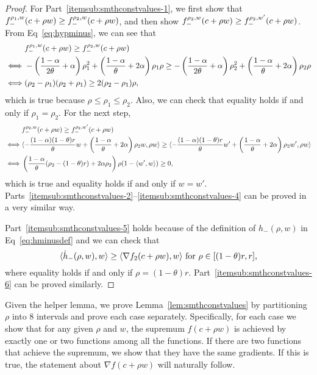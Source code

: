\begin{proof}
	For Part~\ref{itemsub:smthconstvalues-1}, we first show that 
	$f_-^{{\rho_1},{w}}(c+\rho w) \geq f_-^{{\rho_2},{w}}(c+\rho w)$, 
	and then show $f_-^{{\rho_2},{w}}(c+\rho w) \geq f_-^{{\rho_2},{w'}}(c+\rho w)$.
	From Eq~\eqref{eq:hypminus}, we can see that
	\begin{align*}
		&f_-^{{\rho_1},{w}}(c+\rho w) \geq f_-^{{\rho_2},{w}}(c+\rho w)\\
		\iff&- \left ( \frac{1-\alpha}{2\theta} + \alpha \right ) \rho_1^2
		+\left ( \frac{1-\alpha}{\theta}+2\alpha \right ) \rho_1 \rho 
		\geq 
		- \left ( \frac{1-\alpha}{2\theta} + \alpha \right ) \rho_2^2
		+\left ( \frac{1-\alpha}{\theta}+2\alpha \right ) \rho_2 \rho\\
		\iff& (\rho_2-\rho_1)(\rho_2+\rho_1) \geq 2(\rho_2-\rho_1)\rho,
	\end{align*}
	which is true because $\rho \leq \rho_1 \leq \rho_2$. Also, we can check that
	equality holds if and only if $\rho_1 = \rho_2$.
	For the next step,
	\begin{align*}
		&f_-^{{\rho_2},{w}}(c+\rho w) \geq f_-^{{\rho_2},{w'}}(c+\rho w)\\
		\iff&\langle -\frac{(1-\alpha)(1-\theta)r}{\theta} w
		+\left ( \frac{1-\alpha}{\theta}+2\alpha \right ) \rho_2 w, \rho w
		\rangle
		\geq
		\langle -\frac{(1-\alpha)(1-\theta)r}{\theta} w'
		+\left ( \frac{1-\alpha}{\theta}+2\alpha \right ) \rho_2 w', \rho w
		\rangle\\
		\iff& \left ( \frac{1-\alpha}{\theta} (\rho_2 - (1-\theta)r) + 2\alpha \rho_2 \right )
		\rho (1-\langle w',w\rangle) \geq 0,
	\end{align*}
	which is true and equality holds if and only if $w = w'$.
	Parts~\ref{itemsub:smthconstvalues-2}--\ref{itemsub:smthconstvalues-4} can be proved in a very similar way.
	
	Part~\ref{itemsub:smthconstvalues-5} holds because of the definition of $h_-(\rho,w)$ in Eq~\eqref{eq:hminusdef} and we can check that
	\begin{equation*}
		\langle \dot h_-(\rho,w), w \rangle \geq \langle \nabla f_{2}(c+\rho w), w \rangle \text{ for } \rho \in [(1-\theta)r,r],
	\end{equation*}
	where equality holds if and only if $\rho = (1-\theta)r$.  Part~\ref{itemsub:smthconstvalues-6} can be proved similarly.
\end{proof}

Given the helper lemma, we prove Lemma~\ref{lem:smthconstvalues} by partitioning $\rho$ into 8 intervals and prove each case separately. 
Specifically, for each case we show that for any given $\rho$ and $w$,
the supremum $f(c+\rho w)$ is achieved by exactly one or two functions among all the functions.
If there are two functions that achieve the supremum, we show that they have the same gradients.
If this is true, the statement about $\nabla f(c+\rho w)$ will naturally follow. 

